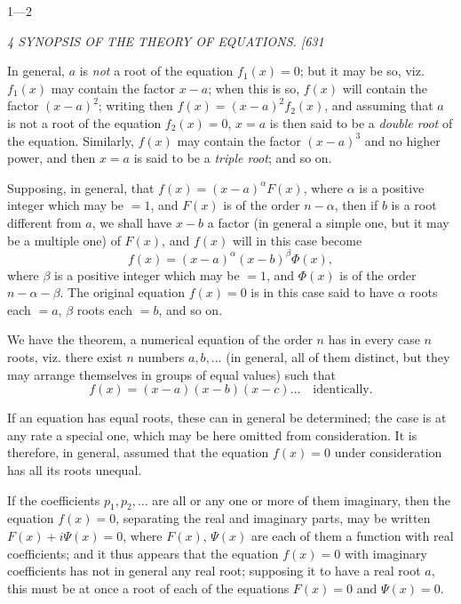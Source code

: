 \documentclass[12pt,a4paper]{article}
\begin{document}
\hfill 1---2

\clearpage
\setcounter{page}{4}

\begin{center}
\textit{4 \hfill SYNOPSIS OF THE THEORY OF EQUATIONS. \hfill [631}
\end{center}

In general, $a$ is \textit{not} a root of the equation $f_1(x) = 0$; but it may be so, viz. $f_1(x)$ may contain the factor $x - a$; when this is so, $f(x)$ will contain the factor $(x-a)^2$; writing then $f(x) = (x-a)^2 f_2(x)$, and assuming that $a$ is not a root of the equation $f_2(x) = 0$, $x = a$ is then said to be a \textit{double root} of the equation. Similarly, $f(x)$ may contain the factor $(x-a)^3$ and no higher power, and then $x = a$ is said to be a \textit{triple root}; and so on.

Supposing, in general, that $f(x) = (x-a)^\alpha F(x)$, where $\alpha$ is a positive integer which may be $=1$, and $F(x)$ is of the order $n-\alpha$, then if $b$ is a root different from $a$, we shall have $x - b$ a factor (in general a simple one, but it may be a multiple one) of $F(x)$, and $f(x)$ will in this case become
\[
f(x) = (x-a)^\alpha (x-b)^\beta \Phi(x),
\]
where $\beta$ is a positive integer which may be $=1$, and $\Phi(x)$ is of the order $n - \alpha - \beta$. The original equation $f(x) = 0$ is in this case said to have $\alpha$ roots each $= a$, $\beta$ roots each $= b$, and so on.

We have the theorem, a numerical equation of the order $n$ has in every case $n$ roots, viz. there exist $n$ numbers $a, b, \ldots$ (in general, all of them distinct, but they may arrange themselves in groups of equal values) such that
\[
f(x) = (x-a)(x-b)(x-c)\ldots \quad \text{identically.}
\]

If an equation has equal roots, these can in general be determined; the case is at any rate a special one, which may be here omitted from consideration. It is therefore, in general, assumed that the equation $f(x) = 0$ under consideration has all its roots unequal.

If the coefficients $p_1, p_2, \ldots$ are all or any one or more of them imaginary, then the equation $f(x) = 0$, separating the real and imaginary parts, may be written $F(x) + i\Psi(x) = 0$, where $F(x)$, $\Psi(x)$ are each of them a function with real coefficients; and it thus appears that the equation $f(x) = 0$ with imaginary coefficients has not in general any real root; supposing it to have a real root $a$, this must be at once a root of each of the equations $F(x) = 0$ and $\Psi(x) = 0$.
\end{document}
